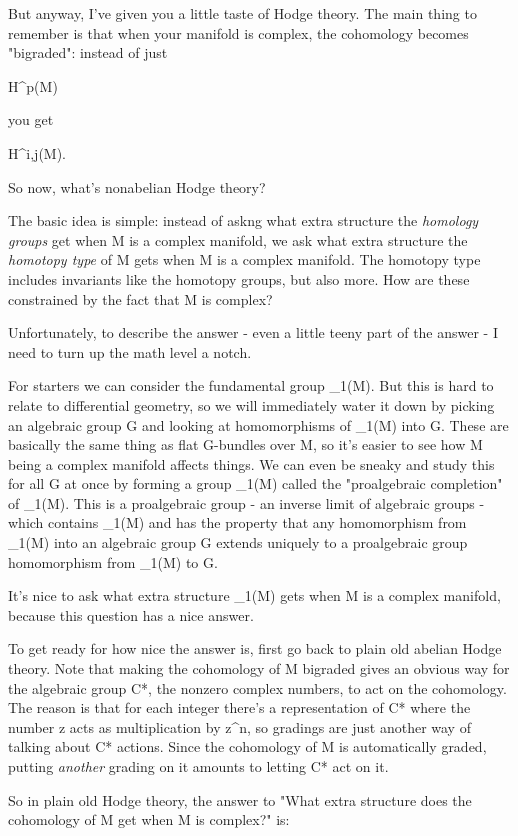 But anyway, I've given you a little taste of Hodge theory.
The main thing to remember is that when your manifold is complex,
the cohomology becomes "bigraded": instead of just

H^{p}(M)

you get

H^{i,j}(M).

So now, what's nonabelian Hodge theory?

The basic idea is simple: instead of askng what extra structure the
\emph{homology groups} get when M is a complex manifold, we ask what
extra structure the \emph{homotopy type} of M gets when M is a complex
manifold.  The homotopy type includes invariants like the homotopy
groups, but also more.  How are these constrained by the fact that
M is complex?

Unfortunately, to describe the answer - even a little teeny part of the
answer - I need to turn up the math level a notch.

For starters we can consider the fundamental group \pi _{1}(M).
But this is hard to relate to differential geometry, so we will
immediately water it down by picking an algebraic group G and looking at
homomorphisms of \pi _{1}(M) into G.  These are basically the same
thing as flat G-bundles over M, so it's easier to see how M being a
complex manifold affects things.  We can even be sneaky and study this
for all G at once by forming a group \Pi _{1}(M) called the
"proalgebraic completion" of \pi _{1}(M).  This is a
proalgebraic group - an inverse limit of algebraic groups - which 
contains \pi _{1}(M) and has the property that any homomorphism
from \pi _{1}(M) into an algebraic group G extends uniquely to a
proalgebraic group homomorphism from \Pi _{1}(M) to G.

It's nice to ask what extra structure \Pi _{1}(M) gets when M is 
a complex manifold, because this question has a nice answer.

To get ready for how nice the answer is, first go back to plain old
abelian Hodge theory.  Note that making the cohomology of M bigraded
gives an obvious way for the algebraic group C*, the nonzero complex
numbers, to act on the cohomology.  The reason is that for each integer
there's a representation of C* where the number z acts as multiplication
by z^{n}, so gradings are just another way of talking about C* actions.
Since the cohomology of M is automatically graded, putting \emph{another}
grading on it amounts to letting C* act on it.

So in plain old Hodge theory, the answer to "What extra structure
does the cohomology of M get when M is complex?" is: 

